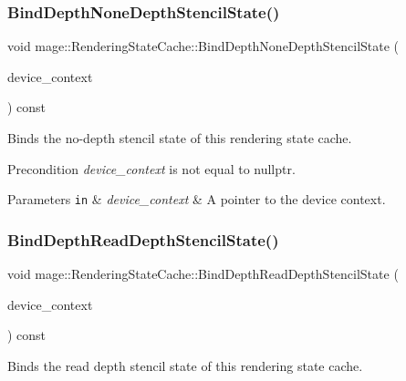 \subsubsection{\texorpdfstring{Bind\+Depth\+None\+Depth\+Stencil\+State()}{BindDepthNoneDepthStencilState()}}
{\footnotesize\ttfamily void mage\+::\+Rendering\+State\+Cache\+::\+Bind\+Depth\+None\+Depth\+Stencil\+State (\begin{DoxyParamCaption}\item[{I\+D3\+D11\+Device\+Context2 $\ast$}]{device\+\_\+context }\end{DoxyParamCaption}) const\hspace{0.3cm}{\ttfamily [noexcept]}}

Binds the no-\/depth stencil state of this rendering state cache.

\begin{DoxyPrecond}{Precondition}
{\itshape device\+\_\+context} is not equal to {\ttfamily nullptr}. 
\end{DoxyPrecond}

\begin{DoxyParams}[1]{Parameters}
\mbox{\tt in}  & {\em device\+\_\+context} & A pointer to the device context. \\
\hline
\end{DoxyParams}
\hypertarget{structmage_1_1_rendering_state_cache_a60252b4a84c012de132a53a67e3f97c3}{}\label{structmage_1_1_rendering_state_cache_a60252b4a84c012de132a53a67e3f97c3} 
\subsubsection{\texorpdfstring{Bind\+Depth\+Read\+Depth\+Stencil\+State()}{BindDepthReadDepthStencilState()}}
{\footnotesize\ttfamily void mage\+::\+Rendering\+State\+Cache\+::\+Bind\+Depth\+Read\+Depth\+Stencil\+State (\begin{DoxyParamCaption}\item[{I\+D3\+D11\+Device\+Context2 $\ast$}]{device\+\_\+context }\end{DoxyParamCaption}) const\hspace{0.3cm}{\ttfamily [noexcept]}}

Binds the read depth stencil state of this rendering state cache.

